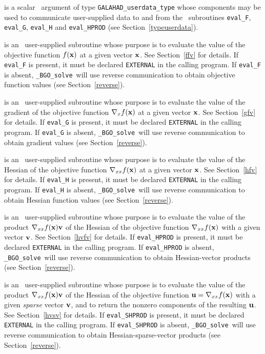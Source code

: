 \documentclass{galahad}
\newcommand{\packagename}{BGO}
\newcommand{\fullpackagename}{\libraryname\_\packagename}
\newcommand{\solver}{{\tt \fullpackagename\_solve}}
\begin{document}
\begin{description}
 is a scalar \intentinout\ argument of type
{\tt GALAHAD\_userdata\_type} whose components may be used
to communicate user-supplied data to and from the
\optional\ subroutines
{\tt eval\_F}, {\tt eval\_G},
{\tt eval\_H} and {\tt eval\_HPROD}
(see Section~\ref{typeuserdata}).

 is an \optional\
user-supplied subroutine whose purpose is to evaluate the value of the
objective function $f({\mathbf{x}})$ at a given vector ${\mathbf{x}}$.
See Section~\ref{ffv} for details.
If {\tt eval\_F} is present,
it must be declared {\tt EXTERNAL} in the calling program.
If {\tt eval\_F} is absent, \solver\ will use reverse communication to
obtain objective function values (see Section~\ref{reverse}).

 is an \optional\
user-supplied subroutine whose purpose is to evaluate the value of the
gradient of the objective function $\nabla_x f({\mathbf{x}})$ at a given vector ${\mathbf{x}}$.
See Section~\ref{gfv} for details.
If {\tt eval\_G} is present,
it must be declared {\tt EXTERNAL} in the calling program.
If {\tt eval\_G} is absent, \solver\ will use reverse communication to
obtain gradient values (see Section~\ref{reverse}).

 is an \optional\
user-supplied subroutine whose purpose is to evaluate the value of the
Hessian of the objective function $\nabla_{xx} f({\mathbf{x}})$ at a given vector ${\mathbf{x}}$.
See Section~\ref{hfv} for details.
If {\tt eval\_H} is present,
it must be declared {\tt EXTERNAL} in the calling program.
If {\tt eval\_H} is absent, \solver\ will use reverse communication to
obtain Hessian function values (see Section~\ref{reverse}).

\itt{eval\_HPROD} is an \optional\
user-supplied subroutine whose purpose is to evaluate the value of the
product $\nabla_{xx} f({\mathbf{x}}){\mathbf{v}}$ of the Hessian of the objective function
$\nabla_{xx} f({\mathbf{x}})$  with a given vector ${\mathbf{v}}$.
See Section~\ref{hvfv} for details.
If {\tt eval\_HPROD} is present,
it must be declared {\tt EXTERNAL} in the calling program.
If {\tt eval\_HPROD} is absent, \solver\ will use reverse communication to
obtain Hessian-vector products (see Section~\ref{reverse}).

\itt{eval\_SHPROD} is an \optional\
user-supplied subroutine whose purpose is to evaluate the value of the
product $\nabla_{xx} f({\mathbf{x}}){\mathbf{v}}$ of the Hessian of the objective function
${\mathbf{u}} = \nabla_{xx} f({\mathbf{x}})$  with a given {\em sparse} vector ${\mathbf{v}}$,
and to return the nonzero components of the resulting ${\mathbf{u}}$.
See Section~\ref{hvsv} for details.
If {\tt eval\_SHPROD} is present,
it must be declared {\tt EXTERNAL} in the calling program.
If {\tt eval\_SHPROD} is absent, \solver\ will use reverse communication to
obtain Hessian-sparse-vector products (see Section~\ref{reverse}).


\end{description}
\end{document}
